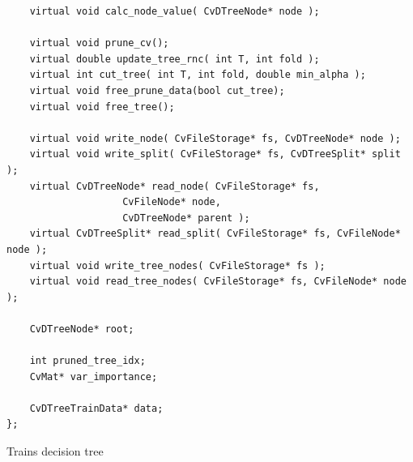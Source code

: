 \begin{lstlisting}
    virtual void calc_node_value( CvDTreeNode* node );

    virtual void prune_cv();
    virtual double update_tree_rnc( int T, int fold );
    virtual int cut_tree( int T, int fold, double min_alpha );
    virtual void free_prune_data(bool cut_tree);
    virtual void free_tree();

    virtual void write_node( CvFileStorage* fs, CvDTreeNode* node );
    virtual void write_split( CvFileStorage* fs, CvDTreeSplit* split );
    virtual CvDTreeNode* read_node( CvFileStorage* fs, 
				    CvFileNode* node, 
				    CvDTreeNode* parent );
    virtual CvDTreeSplit* read_split( CvFileStorage* fs, CvFileNode* node );
    virtual void write_tree_nodes( CvFileStorage* fs );
    virtual void read_tree_nodes( CvFileStorage* fs, CvFileNode* node );

    CvDTreeNode* root;

    int pruned_tree_idx;
    CvMat* var_importance;

    CvDTreeTrainData* data;
};
\end{lstlisting}



Trains decision tree


